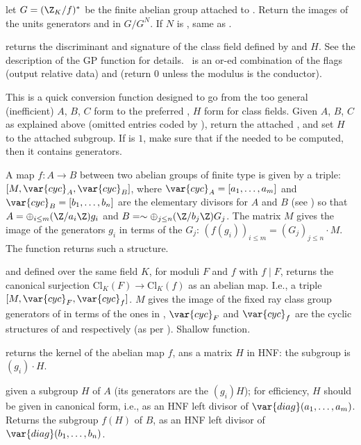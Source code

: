  let
$G = (\Z_K/f)^*$ be the finite abelian group attached to .
Return the images of the units generators  and  in
$G / G^N$. If $N$ is , same as .

 returns the discriminant and
signature of the class field defined by  and $H$. See the description
of the GP function for details. \fl\ is an or-ed combination of the flags
 (output relative data) and  (return 0 unless the
modulus is the conductor).

 This is a
quick conversion function designed to go from the too general (inefficient)
$A$, $B$, $C$ form to the preferred , $H$ form for class fields.
Given $A$, $B$, $C$ as explained above (omitted entries coded by ),
return the attached , and set $H$ to the attached subgroup. If
 is $1$, make sure that if the  needed to be computed,
then it contains generators.

A map $f:A\to B$ between two abelian groups of finite type is given by a
triple: $[M, \var{cyc}_A, \var{cyc}_B]$, where $\var{cyc}_A = [a_1,\dots, a_m]$
and $\var{cyc}_B = [b_1,\dots, b_n]$ are the elementary divisors for $A$ and
$B$ (see ) so that $A = \oplus_{i\leq m} (\Z/a_i\Z) g_i$
and $B = \sim \oplus_{j\leq n} (\Z/b_j\Z) G_j $. The matrix $M$ gives the image
of the generators $g_i$ in terms of the $G_j$: $(f(g_i))_{i\leq m} =
(G_j)_{j\leq n} \cdot M$. The function  returns such a structure.

  and 
defined over the same field $K$, for moduli $F$ and $f$ with
$f\mid F$, returns the canonical surjection
$\text{Cl}_K(F)\to \text{Cl}_K(f)$ as an abelian map. I.e., a triple
$[M,\var{cyc}_F,\var{cyc}_f]$. $M$ gives the image of the fixed ray class
group generators of  in terms of the ones in ,
$\var{cyc}_F$ and $\var{cyc}_f$ are the cyclic structures of  and
 respectively (as per ). Shallow function.

 returns the kernel of the abelian map $f$,
ans a matrix $H$ in HNF: the subgroup is $(g_i)\cdot H$.

 given a subgroup $H$ of
$A$ (its generators are the $(g_i) H$); for efficiency, $H$ should be given in
canonical form, i.e., as an HNF left divisor of $\var{diag}(a_1,\dots,a_m)$.
Returns the subgroup $f(H)$ of $B$, as an HNF left divisor of
$\var{diag}(b_1,\dots,b_n)$.

